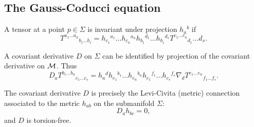 \subsection*{The Gauss-Coducci equation} A tensor at a point $p\in \Sigma$ is invariant under projection $h_a{}^b$ if
\begin{equation}
    T^{a_1\ldots a_n}{}_{b_1 \ldots b_s}= h_{c_1}{}^{a_1}\ldots h_{c_n}{}^{a_n} h_{b_1}{}^{d_1}\ldots h_{b_s}{}^{d_s}T^{c_1\ldots c_n}{}_{d_1}\ldots {d_s}.
\end{equation}
\begin{prop}
A covariant derivative $D$ on $\Sigma$ can be identified by projection of the covariant derivative on $\mathcal{M}$. Thus
\begin{equation}
    D_a T^{b_1 \ldots b_n}{}_{c_1\ldots c_s}=h_a{}^d h_{e_1}{}^{b_1} \ldots h_{e_n}{}^{b_n} h_{c_1}{}^{f_1} \ldots h_{c_s}{}^{f_s} \nabla_d T^{e_1 \ldots e_n}{}_{f_1\ldots f_s}.
    \end{equation}
\end{prop}
\begin{lem}
    The covariant derivative $D$ is precisely the Levi-Civita (metric) connection associated to the metric $h_{ab}$ on the submanifold $\Sigma$:
    \begin{equation}
        D_a h_{bc}=0,
    \end{equation}
    and $D$ is torsion-free.
\end{lem}
